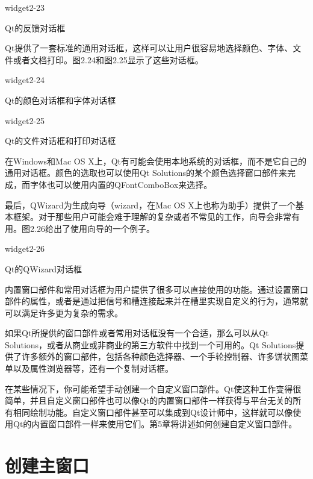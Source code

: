 \documentclass[11pt,oneside]{book}
\begin{document}
\begin{common-format}
\begin{linefig}[0.8]{widget2-23}
\caption{Qt的反馈对话框}
\label{fig:widget2-23}
\end{linefig}

Qt提供了一套标准的通用对话框，这样可以让用户很容易地选择颜色、字体、文件或者文档打印。图2.24和图2.25显示了这些对话框。
\begin{linefig}[0.8]{widget2-24}
\caption{Qt的颜色对话框和字体对话框}
\label{fig:widget2-24}
\end{linefig}

\begin{linefig}[0.8]{widget2-25}
\caption{Qt的文件对话框和打印对话框}
\label{fig:widget2-25}
\end{linefig}

在Windows和Mac OS X上，Qt有可能会使用本地系统的对话框，而不是它自己的通用对话框。颜色的选取也可以使用Qt Solutions的某个颜色选择窗口部件来完成，而字体也可以使用内置的QFontComboBox来选择。

最后，QWizard为生成向导（wizard，在Mac OS X上也称为助手）提供了一个基本框架。对于那些用户可能会难于理解的复杂或者不常见的工作，向导会非常有用。图2.26给出了使用向导的一个例子。

\begin{linefig}[0.8]{widget2-26}
\caption{Qt的QWizard对话框}
\label{fig:widget2-26}
\end{linefig}

内置窗口部件和常用对话框为用户提供了很多可以直接使用的功能。通过设置窗口部件的属性，或者是通过把信号和槽连接起来并在槽里实现自定义的行为，通常就可以满足许多更为复杂的需求。

如果Qt所提供的窗口部件或者常用对话框没有一个合适，那么可以从Qt Solutions，或者从商业或非商业的第三方软件中找到一个可用的。Qt Solutions提供了许多额外的窗口部件，包括各种颜色选择器、一个手轮控制器、许多饼状图菜单以及属性浏览器等，还有一个复制对话框。

在某些情况下，你可能希望手动创建一个自定义窗口部件。Qt使这种工作变得很简单，并且自定义窗口部件也可以像Qt的内置窗口部件一样获得与平台无关的所有相同绘制功能。自定义窗口部件甚至可以集成到Qt设计师中，这样就可以像使用Qt的内置窗口部件一样来使用它们。第5章将讲述如何创建自定义窗口部件。


\chapter{创建主窗口}



\appendix


\end{common-format}
\end{document}
